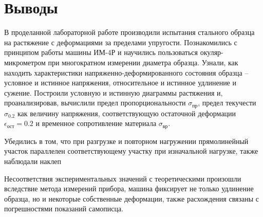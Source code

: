 \documentclass[12pt, a4paper]{article}
\begin{document}
    \newpage
    
    \section{Выводы}
    
     В проделанной лабораторной работе производили испытания стального образца на растяжение с деформациями за пределами упругости. Познакомились с принципом работы машины ИМ-4Р и научились пользоваться окуляр-микрометром при многократном измерении диаметра образца.  Узнали, как находить характеристики напряженно-деформированного состояния образца – условное и истинное напряжения, относительное и истинное удлинение и сужение. Построили условную и истинную диаграммы растяжения и, проанализировав, вычислили предел пропорциональности $\sigma_{\text{пр}}$, предел текучести $\sigma_{0.2}$ как величину напряжения, соответствующую остаточной деформации $ \epsilon_{\text{ост}} = 0.2 $  и временное сопротивление материала $\sigma_{\text{вр}}$.     
    
    Убедились в том, что при разгрузке и повторном нагружении прямолинейный участок параллелен соответствующему участку при изначальной нагрузке, также наблюдали наклеп

Несоответствия экспериментальных значений с теоретическими произошли вследствие метода измерений прибора, машина фиксирует не только удлинение образца, но и некоторые собственные деформации, также расхождения связаны с погрешностями показаний самописца.
    
    \newpage
    
\end{document}
